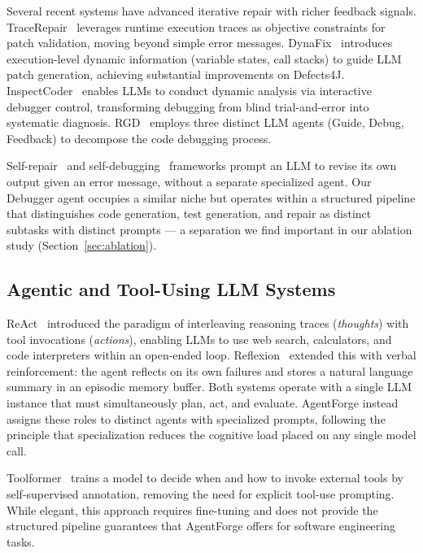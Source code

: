 Several recent systems have advanced iterative
repair with richer feedback signals.
TraceRepair~\cite{tracerepair2026} leverages
runtime execution traces as objective constraints
for patch validation, moving beyond simple error
messages. DynaFix~\cite{dynafix2025} introduces
execution-level dynamic information (variable
states, call stacks) to guide LLM patch generation,
achieving substantial improvements on Defects4J.
InspectCoder~\cite{inspectcoder2025} enables LLMs
to conduct dynamic analysis via interactive
debugger control, transforming debugging from
blind trial-and-error into systematic diagnosis.
RGD~\cite{rgd2024} employs three distinct LLM
agents (Guide, Debug, Feedback) to decompose the
code debugging process.

Self-repair~\cite{olausson2023self} and
self-debugging~\cite{chen2023teaching} frameworks
prompt an LLM to revise its own output given an
error message, without a separate specialized
agent. Our Debugger agent occupies a similar niche
but operates within a structured pipeline that
distinguishes code generation, test generation,
and repair as distinct subtasks with distinct
prompts — a separation we find important in our
ablation study (Section~\ref{sec:ablation}).

\subsection{Agentic and Tool-Using LLM Systems}

ReAct~\cite{yao2023react} introduced the paradigm
of interleaving reasoning traces (\textit{thoughts})
with tool invocations (\textit{actions}), enabling
LLMs to use web search, calculators, and code
interpreters within an open-ended loop.
Reflexion~\cite{shinn2023reflexion} extended this
with verbal reinforcement: the agent reflects on
its own failures and stores a natural language
summary in an episodic memory buffer.
Both systems operate with a single LLM instance
that must simultaneously plan, act, and evaluate.
AgentForge instead assigns these roles to distinct
agents with specialized prompts, following the
principle that specialization reduces the cognitive
load placed on any single model call.

Toolformer~\cite{schick2023toolformer} trains a
model to decide when and how to invoke external
tools by self-supervised annotation, removing the
need for explicit tool-use prompting.
While elegant, this approach requires fine-tuning
and does not provide the structured pipeline
guarantees that AgentForge offers for software
engineering tasks.

